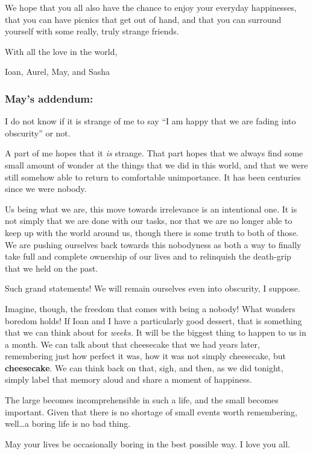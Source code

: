 We hope that you all also have the chance to enjoy your everyday happinesses, that you can have picnics that get out of hand, and that you can surround yourself with some really, truly strange friends.

With all the love in the world,

Ioan, Aurel, May, and Sasha

\hypertarget{mays-addendum}{%
\subsubsection{May's addendum:}\label{mays-addendum}}

I do not know if it is strange of me to say ``I am happy that we are fading into obscurity'' or not.

A part of me hopes that it \emph{is} strange. That part hopes that we always find some small amount of wonder at the things that we did in this world, and that we were still somehow able to return to comfortable unimportance. It has been centuries since we were nobody.

Us being what we are, this move towards irrelevance is an intentional one. It is not simply that we are done with our tasks, nor that we are no longer able to keep up with the world around us, though there is some truth to both of those. We are pushing ourselves back towards this nobodyness as both a way to finally take full and complete ownership of our lives and to relinquish the death-grip that we held on the past.

Such grand statements! We will remain ourselves even into obscurity, I suppose.

Imagine, though, the freedom that comes with being a nobody! What wonders boredom holds! If Ioan and I have a particularly good dessert, that is something that we can think about for \emph{weeks.} It will be the biggest thing to happen to us in a month. We can talk about that cheesecake that we had years later, remembering just how perfect it was, how it was not simply cheesecake, but \textbf{cheesecake}. We can think back on that, sigh, and then, as we did tonight, simply label that memory aloud and share a moment of happiness.

The large becomes incomprehensible in such a life, and the small becomes important. Given that there is no shortage of small events worth remembering, well\ldots a boring life is no bad thing.

May your lives be occasionally boring in the best possible way. I love you all.

